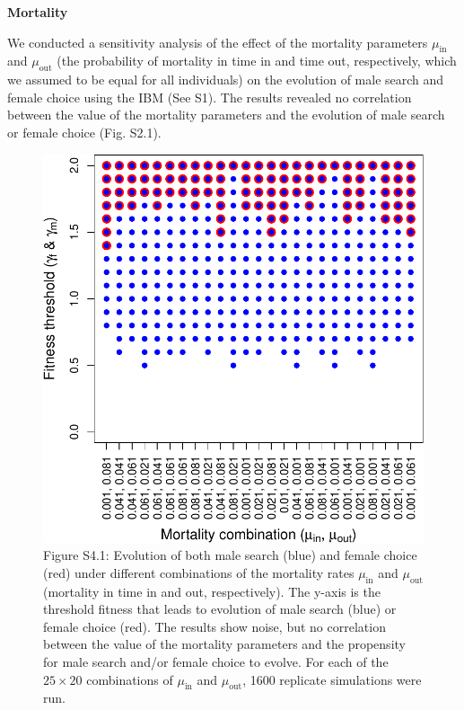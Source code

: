 \documentclass[
]{article}
\begin{document}
\textbf{Mortality}

We conducted a sensitivity analysis of the effect of the mortality
parameters \(\mu_{\mathrm{in}}\) and \(\mu_{\mathrm{out}}\) (the
probability of mortality in time in and time out, respectively, which we
assumed to be equal for all individuals) on the evolution of male search
and female choice using the IBM (See S1). The results revealed no
correlation between the value of the mortality parameters and the
evolution of male search or female choice (Fig. S2.1).

\captionsetup{labelformat=empty}

\begin{figure}
\centering
\includegraphics{ms_refs_fixed_files/figure-latex/unnamed-chunk-6-1.pdf}
\caption{Figure S4.1: Evolution of both male search (blue) and female
choice (red) under different combinations of the mortality rates
\(\mu_{\mathrm{in}}\) and \(\mu_{\mathrm{out}}\) (mortality in time in
and out, respectively). The y-axis is the threshold fitness that leads
to evolution of male search (blue) or female choice (red). The results
show noise, but no correlation between the value of the mortality
parameters and the propensity for male search and/or female choice to
evolve. For each of the \(25 \times 20\) combinations of
\(\mu_{\mathrm{in}}\) and \(\mu_{\mathrm{out}}\), 1600 replicate
simulations were run.}
\end{figure}
\end{document}
